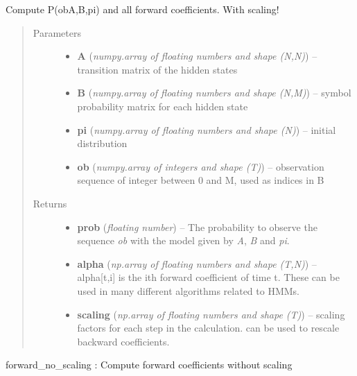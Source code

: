 \documentclass[letterpaper,10pt,english]{sphinxmanual}
\begin{document}

\begin{fulllineitems}
\label{hmm:kernel.python.forward}
Compute P(ob\textbar{}A,B,pi) and all forward coefficients. With scaling!
\begin{quote}\begin{description}
\item[{Parameters}] \leavevmode\begin{itemize}
\item {} 
\textbf{A} (\emph{numpy.array of floating numbers and shape (N,N)}) --
transition matrix of the hidden states

\item {} 
\textbf{B} (\emph{numpy.array of floating numbers and shape (N,M)}) --
symbol probability matrix for each hidden state

\item {} 
\textbf{pi} (\emph{numpy.array of floating numbers and shape (N)}) --
initial distribution

\item {} 
\textbf{ob} (\emph{numpy.array of integers and shape (T)}) --
observation sequence of integer between 0 and M, used as indices in B

\end{itemize}

\item[{Returns}] \leavevmode
\begin{itemize}
\item {} 
\textbf{prob} (\emph{floating number}) --
The probability to observe the sequence \emph{ob} with the model given
by \emph{A}, \emph{B} and \emph{pi}.

\item {} 
\textbf{alpha} (\emph{np.array of floating numbers and shape (T,N)}) --
alpha{[}t,i{]} is the ith forward coefficient of time t. These can be
used in many different algorithms related to HMMs.

\item {} 
\textbf{scaling} (\emph{np.array of floating numbers and shape (T)}) --
scaling factors for each step in the calculation. can be used to
rescale backward coefficients.

\end{itemize}


\end{description}\end{quote}




forward\_no\_scaling : Compute forward coefficients without scaling



\end{fulllineitems}
\end{document}
